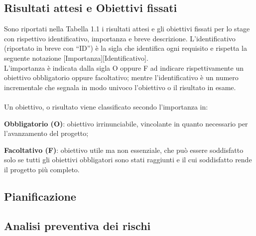 \subsection{Risultati attesi e Obiettivi fissati}
Sono riportati nella Tabella 1.1 i risultati attesi e gli obiettivi fissati per lo stage con rispettivo identificativo, importanza e breve descrizione.
L'identificativo (riportato in breve con “ID”) è la sigla che identifica ogni requisito e rispetta la seguente notazione [Importanza][Identificativo]. \\
L’importanza è indicata dalla sigla O oppure F ad indicare rispettivamente un obiettivo
obbligatorio oppure facoltativo; mentre l’identificativo è un numero incrementale che
segnala in modo univoco l’obiettivo o il risultato in esame.\\
\\
Un obiettivo, o risultato viene classificato secondo l'importanza in: 
\begin{list}{*}{}
    \item \textbf{Obbligatorio (O)}: obiettivo irrinunciabile, vincolante in quanto necessario per l'avanzamento del progetto;
    \item \textbf{Facoltativo (F)}: obiettivo utile ma non essenziale, che può essere soddisfatto solo se tutti gli obiettivi obbligatori sono stati raggiunti e il cui soddisfatto rende il progetto più completo.     
\end{list} 
\pagebreak
\subsection{Pianificazione}

\subsection{Analisi preventiva dei rischi}


